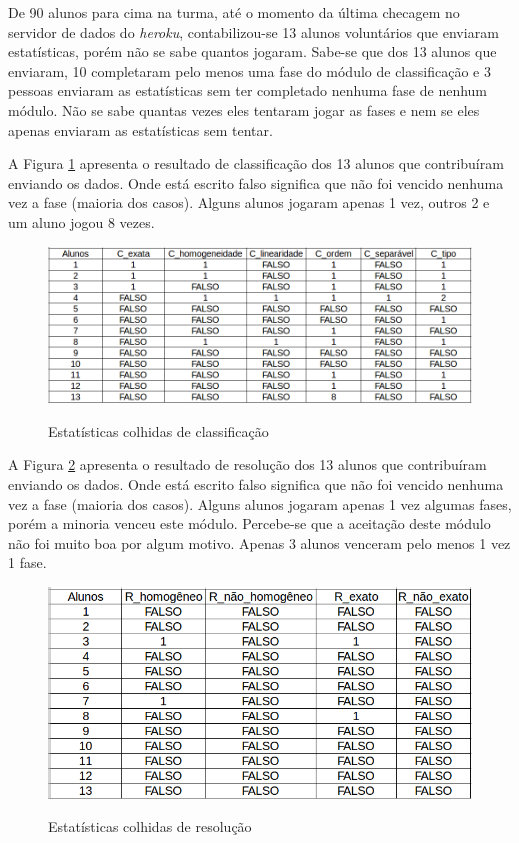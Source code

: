 De 90 alunos para cima na turma, até o momento da última checagem no servidor de dados do \textit{heroku}, contabilizou-se 13 alunos voluntários que enviaram estatísticas, porém não se sabe quantos jogaram. Sabe-se que dos 13 alunos que enviaram, 10 completaram pelo menos uma fase do módulo de classificação e 3 pessoas enviaram as estatísticas sem ter completado nenhuma fase de nenhum módulo. Não se sabe quantas vezes eles tentaram jogar as fases e nem se eles apenas enviaram as estatísticas sem tentar. 

A Figura \ref{est_cla} apresenta o resultado de classificação dos 13 alunos que contribuíram enviando os dados. Onde está escrito falso significa que não foi vencido nenhuma vez a fase (maioria dos casos). Alguns alunos jogaram apenas 1 vez, outros 2 e um aluno jogou 8 vezes.

\begin{figure}[H]
\centering
\caption{Estatísticas colhidas de classificação}
\includegraphics[scale=0.5]{figuras/estatisticas/estatisticas_classificacao.png}
\label{est_cla}
\end{figure}


A Figura \ref{est_res} apresenta o resultado de resolução dos 13 alunos que contribuíram enviando os dados. Onde está escrito falso significa que não foi vencido nenhuma vez a fase (maioria dos casos). Alguns alunos jogaram apenas 1 vez algumas fases, porém a minoria venceu este módulo. Percebe-se que a aceitação deste módulo não foi muito boa por algum motivo. Apenas 3 alunos venceram pelo menos 1 vez 1 fase.

\begin{figure}[H]
\centering
\caption{Estatísticas colhidas de resolução}
\includegraphics[scale=0.5]{figuras/estatisticas/estatisticas_resolucao.png}
\label{est_res}
\end{figure}

